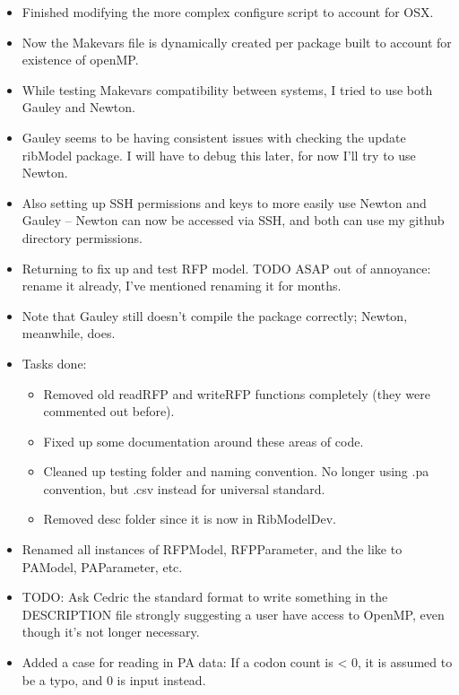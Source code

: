 \documentclass[12pt,hyperref]{labbook}
\begin{document}

\begin{itemize}
    \item Finished modifying the more complex configure script to account for OSX.
    \item Now the Makevars file is dynamically created per package built to account for existence of openMP.
    \item While testing Makevars compatibility between systems, I tried to use both Gauley and Newton.
    \item Gauley seems to be having consistent issues with checking the update ribModel package. I will have to debug this later, for now I'll try to use Newton.
    \item Also setting up SSH permissions and keys to more easily use Newton and Gauley -- Newton can now be accessed via SSH, and both can use my github directory permissions.
\end{itemize}


\begin{itemize}
    \item Returning to fix up and test RFP model. TODO ASAP out of annoyance: rename it already, I've mentioned renaming it for months.
    \item Note that Gauley still doesn't compile the package correctly; Newton, meanwhile, does.
    \item Tasks done:
    \begin{itemize}
        \item Removed old readRFP and writeRFP functions completely (they were commented out before).
        \item Fixed up some documentation around these areas of code.
        \item Cleaned up testing folder and naming convention. No longer using .pa convention, but .csv instead for universal standard.
        \item Removed desc folder since it is now in RibModelDev.
    \end{itemize}
\end{itemize}


\begin{itemize}
    \item Renamed all instances of RFPModel, RFPParameter, and the like to PAModel, PAParameter, etc.
    \item TODO: Ask Cedric the standard format to write something in the DESCRIPTION file strongly suggesting a user have access to OpenMP, even though it's not longer necessary.
    \item Added a case for reading in PA data: If a codon count is < 0, it is assumed to be a typo, and 0 is input instead.
\end{itemize}
\end{document}
